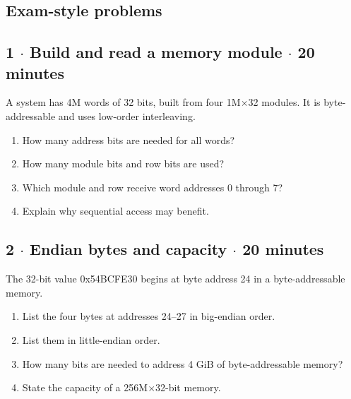 \documentclass[11pt]{article}
\begin{document}
\begin{keepsection}
\end{keepsection}

\begin{keepsection}
\section{Exam-style problems}

\begin{keepsection}
\subsection{1 \ensuremath{\cdot} Build and read a memory module \ensuremath{\cdot} 20 minutes}

A system has 4M words of 32 bits, built from four 1M\ensuremath{\times}32 modules. It is byte-addressable and uses low-order interleaving.

\begin{enumerate}
\item How many address bits are needed for all words?
\item How many module bits and row bits are used?
\item Which module and row receive word addresses 0 through 7?
\item Explain why sequential access may benefit.
\end{enumerate}

\end{keepsection}

\begin{keepsection}
\subsection{2 \ensuremath{\cdot} Endian bytes and capacity \ensuremath{\cdot} 20 minutes}

The 32-bit value 0x54BCFE30 begins at byte address 24 in a byte-addressable memory.

\begin{enumerate}
\item List the four bytes at addresses 24–27 in big-endian order.
\item List them in little-endian order.
\item How many bits are needed to address 4 GiB of byte-addressable memory?
\item State the capacity of a 256M\ensuremath{\times}32-bit memory.
\end{enumerate}

\end{keepsection}
\end{keepsection}
\end{document}
